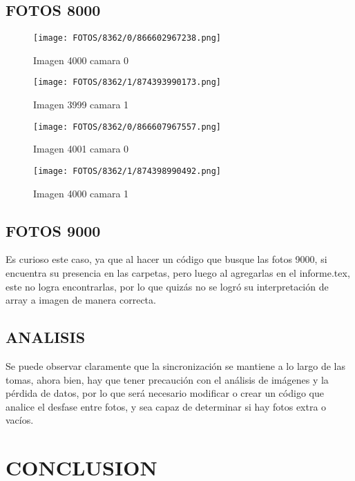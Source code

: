 \documentclass{article}
\begin{document}
\subsection{FOTOS 8000}

\begin{figure}[H]
  \centering
  \begin{minipage}[b]{0.45\textwidth}
    \centering
    \texttt{[image: FOTOS/8362/0/866602967238.png]}
    \caption{Imagen 4000 camara 0}
  \end{minipage}
  \begin{minipage}[b]{0.45\textwidth}
    \centering
    \texttt{[image: FOTOS/8362/1/874393990173.png]}
    \caption{Imagen 3999 camara 1}
  \end{minipage}
  \begin{minipage}[b]{0.45\textwidth}
    \centering
    \texttt{[image: FOTOS/8362/0/866607967557.png]}
    \caption{Imagen 4001 camara 0}
  \end{minipage}
  \begin{minipage}[b]{0.45\textwidth}
    \centering
    \texttt{[image: FOTOS/8362/1/874398990492.png]}
    \caption{Imagen 4000 camara 1}
  \end{minipage}
\end{figure}

\subsection{FOTOS 9000}

\noindent Es curioso este caso, ya que al hacer un código que busque las fotos 9000, si encuentra su presencia en las carpetas, pero luego al agregarlas en el informe.tex,
este no logra encontrarlas, por lo que quizás no se logró su interpretación de array a imagen de manera correcta.

\subsection{ANALISIS}

\noindent Se puede observar claramente que la sincronización se mantiene a lo largo de las tomas, ahora bien, hay que tener precaución con el análisis de imágenes y la pérdida de datos,
por lo que será necesario modificar o crear un código que analice el desfase entre fotos, y sea capaz de determinar si hay fotos extra o vacíos. 

\section{CONCLUSION}
\end{document}
